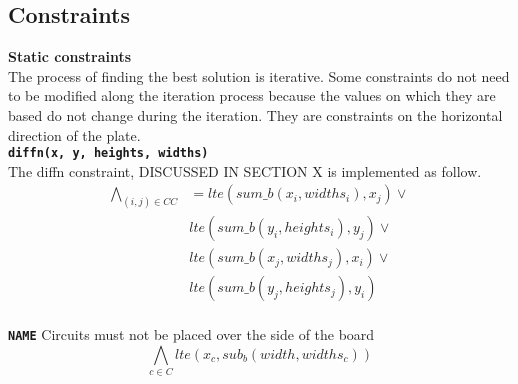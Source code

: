 








\subsection{Constraints}

  \textbf{Static constraints}\\
  The process of finding the best solution is iterative. Some constraints do not 
  need to be modified along the iteration process because the values on which they 
  are based do not change during the iteration. They are constraints on the horizontal 
  direction of the plate.\\

  \texttt\textbf{diffn(x, y, heights, widths)}\\
  The diffn constraint, DISCUSSED IN SECTION X is implemented as follow.
  \begin{equation}
      \begin{split}
          \bigwedge\limits_{(i, j) \in CC}&=
          lte(sum\_b(x_i, widths_i), x_j) \vee \\
          &lte(sum\_b(y_i, heights_i), y_j) \vee \\
          &lte(sum\_b(x_j, widths_j), x_i) \vee \\
          &lte(sum\_b(y_j, heights_j), y_i)
      \end{split}
  \end{equation}\\

  \texttt\textbf{NAME} Circuits must not be placed over the side of the board\\
  \begin{equation}
      \bigwedge\limits_{c \in C} lte(x_c, sub_b(width, widths_c))
  \end{equation}\\

